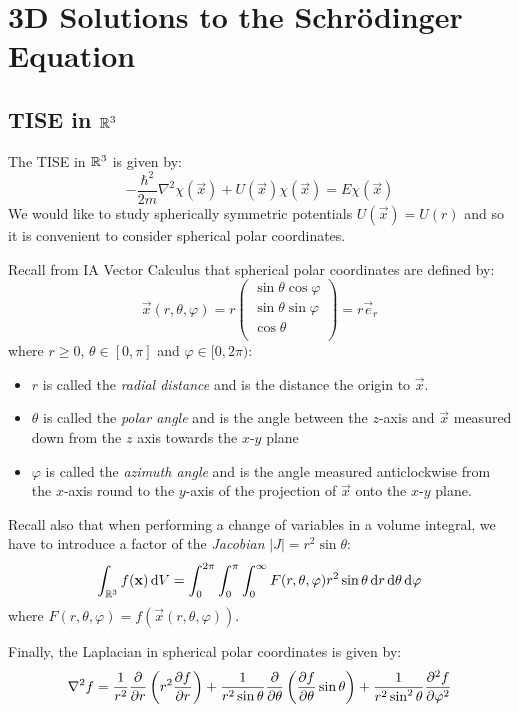 \documentclass[../main.tex]{subfiles}
\begin{document}
\chapter{3D Solutions to the Schr\"odinger Equation}
\section{TISE in \texorpdfstring{$\mathbb{R}^3$}{3D}}
The TISE in $\mathbb{R}^3$ is given by:
\begin{equation}
  -\frac{\hbar^2}{2m} \nabla^2 \chi(\vec{x}) + U(\vec{x})\chi(\vec{x}) = E\chi(\vec{x}) \label{TISE3DDef}
\end{equation}
We would like to study spherically symmetric potentials $U(\vec{x}) = U(r)$ and so it is convenient to consider spherical polar coordinates.
\begin{remark}[Recap]
  Recall from IA Vector Calculus that spherical polar coordinates are defined by:
  \[
    \vec{x}(r, \theta, \varphi) = r\begin{pmatrix}
    \sin \theta \cos \varphi \\
    \sin \theta \sin \varphi \\
    \cos \theta \\
    \end{pmatrix} = r \vec{e}_r
  \]
  where $r \geq 0$, $\theta \in [0, \pi]$ and $\varphi \in [0, 2\pi)$:
  \begin{itemize}
    \item $r$ is called the \textit{radial distance} and is the distance the origin to $\vec{x}$.
    \item $\theta$ is called the \textit{polar angle} and is the angle between the $z$-axis and $\vec{x}$ measured down from the $z$ axis towards the $x$-$y$ plane
    \item $\varphi$ is called the \textit{azimuth angle} and is the angle measured anticlockwise from the $x$-axis round to the $y$-axis of the projection of $\vec{x}$ onto the $x$-$y$ plane.
  \end{itemize}
  Recall also that when performing a change of variables in a volume integral, we have to introduce a factor of the \textit{Jacobian} $|J| = r^2 \sin \theta$:
  \[
    \int_{\R^3} f(\vec{x}) \d{V} = \int_{0}^{2\pi} \int_{0}^{\pi} \int_{0}^{\infty} F(r, \theta, \varphi) r^2 \sin \theta \d{r} \d{\theta} \d{\varphi}
  \]
  where $F(r, \theta, \varphi) = f(\vec{x}(r, \theta, \varphi))$.

  Finally, the Laplacian in spherical polar coordinates is given by:
  \begin{equation}
    \nabla^2 f = \frac{1}{r^2} \pderiv{}{r}\left(r^2 \pderiv{f}{r}\right) + \frac{1}{r^2 \sin \theta} \pderiv{}{\theta}\left(\pderiv{f}{\theta} \sin \theta\right) + \frac{1}{r^2 \sin^2 \theta} \pderiv[2]{f}{\varphi} \label{lapSpher}
  \end{equation}
\end{remark}
\end{document}
